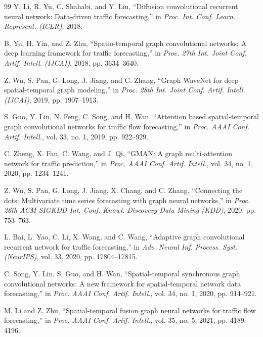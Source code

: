 \begingroup
\linespread{1.05}\selectfont
\begin{thebibliography}{99}
\setlength{\itemsep}{3pt}
Y. Li, R. Yu, C. Shahabi, and Y. Liu, ``Diffusion convolutional recurrent neural network: Data-driven traffic forecasting,'' in \emph{Proc. Int. Conf. Learn. Represent. (ICLR)}, 2018.

B. Yu, H. Yin, and Z. Zhu, ``Spatio-temporal graph convolutional networks: A deep learning framework for traffic forecasting,'' in \emph{Proc. 27th Int. Joint Conf. Artif. Intell. (IJCAI)}, 2018, pp. 3634--3640.

Z. Wu, S. Pan, G. Long, J. Jiang, and C. Zhang, ``Graph WaveNet for deep spatial-temporal graph modeling,'' in \emph{Proc. 28th Int. Joint Conf. Artif. Intell. (IJCAI)}, 2019, pp. 1907--1913.

S. Guo, Y. Lin, N. Feng, C. Song, and H. Wan, ``Attention based spatial-temporal graph convolutional networks for traffic flow forecasting,'' in \emph{Proc. AAAI Conf. Artif. Intell.}, vol. 33, no. 1, 2019, pp. 922--929.

C. Zheng, X. Fan, C. Wang, and J. Qi, ``GMAN: A graph multi-attention network for traffic prediction,'' in \emph{Proc. AAAI Conf. Artif. Intell.}, vol. 34, no. 1, 2020, pp. 1234--1241.

Z. Wu, S. Pan, G. Long, J. Jiang, X. Chang, and C. Zhang, ``Connecting the dots: Multivariate time series forecasting with graph neural networks,'' in \emph{Proc. 26th ACM SIGKDD Int. Conf. Knowl. Discovery Data Mining (KDD)}, 2020, pp. 753--763.

L. Bai, L. Yao, C. Li, X. Wang, and C. Wang, ``Adaptive graph convolutional recurrent network for traffic forecasting,'' in \emph{Adv. Neural Inf. Process. Syst. (NeurIPS)}, vol. 33, 2020, pp. 17804--17815.

C. Song, Y. Lin, S. Guo, and H. Wan, ``Spatial-temporal synchronous graph convolutional networks: A new framework for spatial-temporal network data forecasting,'' in \emph{Proc. AAAI Conf. Artif. Intell.}, vol. 34, no. 1, 2020, pp. 914--921.

M. Li and Z. Zhu, ``Spatial-temporal fusion graph neural networks for traffic flow forecasting,'' in \emph{Proc. AAAI Conf. Artif. Intell.}, vol. 35, no. 5, 2021, pp. 4189--4196.


\end{thebibliography}
